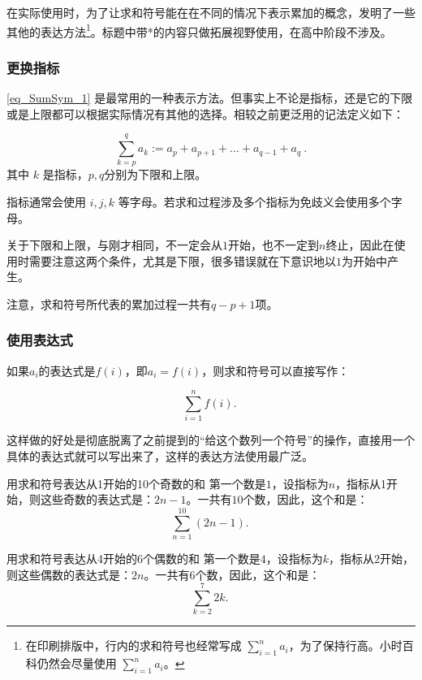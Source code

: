 在实际使用时，为了让求和符号能在在不同的情况下表示累加的概念，发明了一些其他的表达方法\footnote{在印刷排版中，行内的求和符号也经常写成 $\sum_{i=1}^n a_i$，为了保持行高。小时百科仍然会尽量使用 $\sum\limits_{i=1}^n a_i$。}。标题中带*的内容只做拓展视野使用，在高中阶段不涉及。

\subsubsection{更换指标}

\autoref{eq_SumSym_1} 是最常用的一种表示方法。但事实上不论是指标，还是它的下限或是上限都可以根据实际情况有其他的选择。相较之前更泛用的记法定义如下：

\begin{equation}
\sum_{k=p}^q a_k := a_p + a_{p+1} + \dots +a_{q-1}+ a_q~.
\end{equation}
其中 $k$ 是指标，$p,q$分别为下限和上限。

指标通常会使用 $i,j,k$ 等字母。若求和过程涉及多个指标为免歧义会使用多个字母。

关于下限和上限，与刚才相同，不一定会从$1$开始，也不一定到$n$终止，因此在使用时需要注意这两个条件，尤其是下限，很多错误就在下意识地以$1$为开始中产生。

注意，求和符号所代表的累加过程一共有$q-p+1$项。

\subsubsection{使用表达式}

如果$a_i$的表达式是$f(i)$，即$a_i=f(i)$，则求和符号可以直接写作：

\begin{equation}\label{eq_SumSym_2}
\sum_{i=1}^n f(i) .~
\end{equation}

这样做的好处是彻底脱离了之前提到的“给这个数列一个符号”的操作，直接用一个具体的表达式就可以写出来了，这样的表达方法使用最广泛。

\begin{example}{用求和符号表达从1开始的10个奇数的和}
第一个数是$1$，设指标为$n$，指标从1开始，则这些奇数的表达式是：$2n-1$。一共有$10$个数，因此，这个和是：
$$\sum_{n=1}^{10}(2n-1).~$$
\end{example}

\begin{example}{用求和符号表达从4开始的6个偶数的和}
第一个数是$4$，设指标为$k$，指标从$2$开始，则这些偶数的表达式是：$2n$。一共有$6$个数，因此，这个和是：
$$\sum_{k=2}^{7}{2k} .~$$
\end{example}

